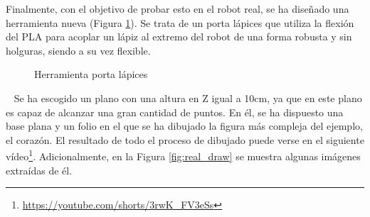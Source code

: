 Finalmente, con el objetivo de probar esto en el robot real, se ha diseñado una herramienta nueva (Figura \ref{fig:pen_tool}). Se trata de un porta lápices que utiliza la 
flexión del \acs{PLA} para acoplar un lápiz al extremo del robot de una forma robusta y sin holguras, siendo a su vez flexible.
\begin{figure} [ht!]
    \centering  
    \hspace{1cm}
    \caption{Herramienta porta lápices}
    \label{fig:pen_tool}
\end{figure}\ 
\newpage
Se ha escogido un plano con una altura en Z igual a 10cm, ya que en este plano es capaz de alcanzar una gran cantidad de puntos. En él, se ha dispuesto 
una base plana y un folio en el que se ha dibujado la figura más compleja del ejemplo, el corazón. El resultado de todo el proceso de dibujado puede verse en el siguiente 
vídeo\footnote{\url{https://youtube.com/shorts/3rwK_FV3eSs}}. Adicionalmente, en la Figura \ref{fig:real_draw} se muestra algunas imágenes extraídas de él.
